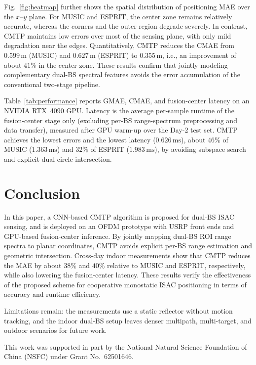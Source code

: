 \documentclass[sigconf]{acmart}
\begin{document}
Fig.~\ref{fig:heatmap} further shows the spatial distribution of positioning MAE over the $x$--$y$ plane. For MUSIC and ESPRIT, the center zone remains relatively accurate, whereas the corners and the outer region degrade severely. In contrast, CMTP maintains low errors over most of the sensing plane, with only mild degradation near the edges. Quantitatively, CMTP reduces the CMAE from $0.599\,\mathrm{m}$ (MUSIC) and $0.627\,\mathrm{m}$ (ESPRIT) to $0.355\,\mathrm{m}$, i.e., an improvement of about $41\%$ in the center zone. These results confirm that jointly modeling complementary dual-BS spectral features avoids the error accumulation of the conventional two-stage pipeline.

Table~\ref{tab:performance} reports GMAE, CMAE, and fusion-center latency on an NVIDIA RTX~4090 GPU.
Latency is the average per-sample runtime of the fusion-center stage only (excluding per-BS range-spectrum preprocessing and data transfer), measured after GPU warm-up over the Day-2 test set.
CMTP achieves the lowest errors and the lowest latency ($0.626\,\mathrm{ms}$), about $46\%$ of MUSIC ($1.363\,\mathrm{ms}$) and $32\%$ of ESPRIT ($1.983\,\mathrm{ms}$), by avoiding subspace search and explicit dual-circle intersection.

\section{Conclusion}
In this paper, a CNN-based CMTP algorithm is proposed for dual-BS ISAC sensing, and is deployed on an OFDM prototype with USRP front ends and GPU-based fusion-center inference. By jointly mapping dual-BS ROI range spectra to planar coordinates, CMTP avoids explicit per-BS range estimation and geometric intersection. Cross-day indoor measurements show that CMTP reduces the MAE by about $38\%$ and $40\%$ relative to MUSIC and ESPRIT, respectively, while also lowering the fusion-center latency. These results verify the effectiveness of the proposed scheme for cooperative monostatic ISAC positioning in terms of accuracy and runtime efficiency.

Limitations remain: the measurements use a static reflector without motion tracking, and the indoor dual-BS setup leaves denser multipath, multi-target, and outdoor scenarios for future work.

\begin{acks}
This work was supported in part by the National Natural Science Foundation of China (NSFC) under Grant No.~62501646.
\end{acks}



\end{document}
